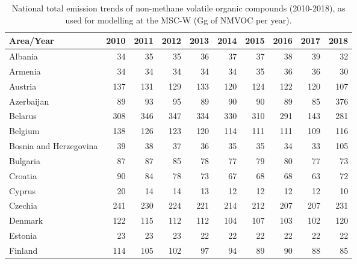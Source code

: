  \begin{table}
 \caption{National total emission trends of non-methane volatile organic compounds (2010-2018), as used for modelling at the MSC-W (Gg of NMVOC per year).}
 
 \vspace{15pt}
 
 \scriptsize
 \centering
 \begin{tabular}{|l|r|r|r|r|r|r|r|r|r|}
 \hline
                     Area/Year&   2010&   2011&   2012&   2013&   2014&   2015&   2016&   2017&   2018\\\hline\hline
                       Albania&     34&     35&     35&     36&     37&     37&     38&     39&     32\\\hline
                       Armenia&     34&     34&     34&     34&     34&     35&     36&     36&     30\\\hline
                       Austria&    137&    131&    129&    133&    120&    124&    122&    120&    107\\\hline
                    Azerbaijan&     89&     93&     95&     89&     90&     90&     89&     85&    376\\\hline
                       Belarus&    308&    346&    347&    334&    330&    310&    291&    143&    281\\\hline
                       Belgium&    138&    126&    123&    120&    114&    111&    111&    109&    116\\\hline
        Bosnia and Herzegovina&     39&     38&     37&     36&     35&     35&     34&     33&    105\\\hline
                      Bulgaria&     87&     87&     85&     78&     77&     79&     80&     77&     73\\\hline
                       Croatia&     90&     84&     78&     73&     67&     68&     68&     63&     72\\\hline
                        Cyprus&     20&     14&     14&     13&     12&     12&     12&     12&     10\\\hline
                       Czechia&    241&    230&    224&    221&    214&    212&    207&    207&    231\\\hline
                       Denmark&    122&    115&    112&    112&    104&    107&    103&    102&    120\\\hline
                       Estonia&     23&     23&     23&     22&     22&     22&     22&     22&     22\\\hline
                       Finland&    114&    105&    102&     97&     94&     89&     90&     88&     85\\\hline

\end{tabular}
\end{table}
